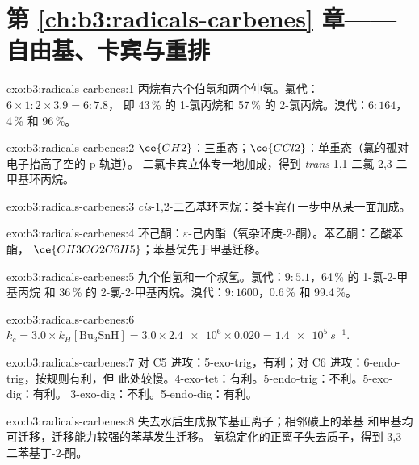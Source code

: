 \section*{第 \ref{ch:b3:radicals-carbenes} 章——自由基、卡宾与重排}

\begin{solution}{exo:b3:radicals-carbenes:1}
丙烷有六个伯氢和两个仲氢。氯代：$6 \times 1 : 2 \times 3.9 = 6 : 7.8$，
即 43\,\% 的 1-氯丙烷和 57\,\% 的 2-氯丙烷。溴代：$6 : 164$，4\,\% 和
96\,\%。
\end{solution}

\begin{solution}{exo:b3:radicals-carbenes:2}
$\ce{CH2}$：三重态；$\ce{CCl2}$：单重态（氯的孤对电子抬高了空的 p 轨道）。
二氯卡宾立体专一地加成，得到 \textit{trans}-1,1-二氯-2,3-二甲基环丙烷。
\end{solution}

\begin{solution}{exo:b3:radicals-carbenes:3}
\textit{cis}-1,2-二乙基环丙烷：类卡宾在一步中从某一面加成。
\end{solution}

\begin{solution}{exo:b3:radicals-carbenes:4}
环己酮：$\varepsilon$-己内酯（氧杂环庚-2-酮）。苯乙酮：乙酸苯酯，
$\ce{CH3CO2C6H5}$；苯基优先于甲基迁移。
\end{solution}

\begin{solution}{exo:b3:radicals-carbenes:5}
九个伯氢和一个叔氢。氯代：$9 : 5.1$，64\,\% 的 1-氯-2-甲基丙烷
和 36\,\% 的 2-氯-2-甲基丙烷。溴代：$9 : 1600$，0.6\,\% 和 99.4\,\%。
\end{solution}

\begin{solution}{exo:b3:radicals-carbenes:6}
$k_c = 3.0 \times k_H[\mathrm{Bu_3SnH}] = 3.0 \times \num{2.4e6} \times 0.020 = \qty{1.4e5}{s^{-1}}$.
\end{solution}

\begin{solution}{exo:b3:radicals-carbenes:7}
对 C5 进攻：5-exo-trig，有利；对 C6 进攻：6-endo-trig，按规则有利，但
此处较慢。4-exo-tet：有利。5-endo-trig：不利。5-exo-dig：有利。
3-exo-dig：不利。5-endo-dig：有利。
\end{solution}

\begin{solution}{exo:b3:radicals-carbenes:8}
失去水后生成叔苄基正离子；相邻碳上的苯基
和甲基均可迁移，迁移能力较强的苯基发生迁移。
氧稳定化的正离子失去质子，得到 3,3-二苯基丁-2-酮。
\end{solution}

